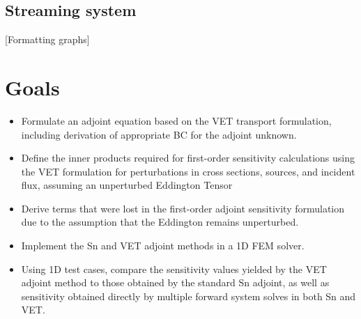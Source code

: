 \documentclass{article}
\begin{document}
\subsection{Streaming system}

[Formatting graphs]

\section{Goals}

\begin{itemize}
\item Formulate an adjoint equation based on the VET transport formulation, including derivation of appropriate BC for the adjoint unknown.
\item Define the inner products required for first-order sensitivity calculations using the VET formulation for perturbations in cross sections, sources, and incident flux, assuming an unperturbed Eddington Tensor
\item Derive terms that were lost in the first-order adjoint sensitivity formulation due to the assumption that the Eddington remains unperturbed. 
\item Implement the Sn and VET adjoint methods in a 1D FEM solver. 
\item Using 1D test cases, compare the sensitivity values yielded by the VET adjoint method to those obtained by the standard Sn adjoint, as well as sensitivity obtained directly by multiple forward system solves in both Sn and VET.
\end{itemize}

\newpage

\end{document}
